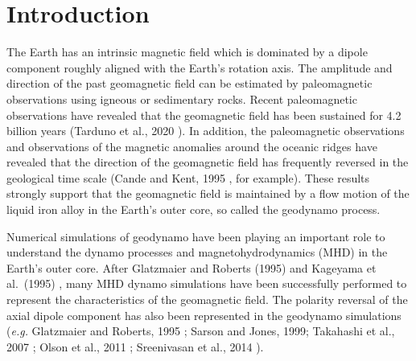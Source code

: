 \newpage
\section{Introduction}
\label{section:introduction}
The Earth has an intrinsic magnetic field which is dominated by a dipole component roughly aligned with the Earth's rotation axis. 
The amplitude and direction of the past geomagnetic field can be estimated by paleomagnetic observations using igneous or sedimentary rocks. Recent paleomagnetic observations have revealed that the geomagnetic field has been sustained for 4.2 billion years (Tarduno et al., 2020 \cite{Tarduno:2020}).
In addition, the paleomagnetic observations and observations of the magnetic anomalies around the oceanic ridges have revealed that the direction of the geomagnetic field has frequently reversed in the geological time scale (Cande and Kent, 1995 \cite{Cande:1995}, for example). 
These results strongly support that the geomagnetic field is maintained by a flow motion of the liquid iron alloy in the Earth's outer core, so called the geodynamo process.

{\color{red}
Numerical simulations of geodynamo have been playing an important role to understand the dynamo processes and magnetohydrodynamics (MHD) in the Earth's outer core.
}
After Glatzmaier and Roberts (1995) \cite{GR:1995} and Kageyama et al.\ (1995) \cite{Kageyama:1995}, many MHD dynamo simulations have been successfully performed to represent the characteristics of the geomagnetic field. 
The polarity reversal of the axial dipole component has also been represented in the geodynamo simulations ({\it e.g.} Glatzmaier and Roberts, 1995 \cite{GR:1995}; Sarson and Jones, 1999\cite{Sarson:1999}; Takahashi et al., 2007 \cite{TMH:2007}; Olson et al., 2011 \cite{Olson:2011}; Sreenivasan et al., 2014  \cite{Sreenivasan:2014}).

